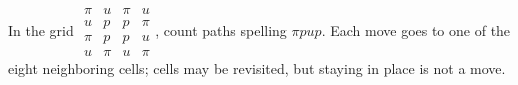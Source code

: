 In the grid $\begin{array}{cccc}\pi&u&\pi&u\\u&p&p&\pi\\\pi&p&p&u\\u&\pi&u&\pi\end{array}$, count paths spelling $\pi pup$. Each move goes to one of the eight neighboring cells; cells may be revisited, but staying in place is not a move.
